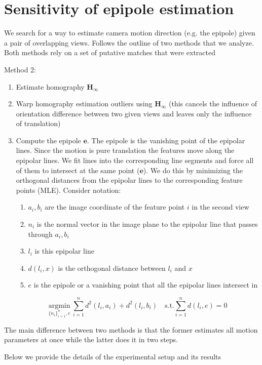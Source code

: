 \documentclass[10pt]{article}         %
\begin{document}
\section{Sensitivity of epipole estimation}
We search for a way to estimate camera motion direction (e.g. the
epipole) given a pair of overlapping views.  Follows the outline of
two methods that we analyze.  Both methods rely on a set of putative matches that were extracted 

\item Method 2:
\begin{enumerate}
\item Estimate homography $\mathbf{H}_{\boldsymbol{\infty}}$
\item Warp homography estimation outliers using
  $\mathbf{H}_{\boldsymbol{\infty}}$ (this cancels the influence of
  orientation difference between two given views and leaves
  only the influence of translation)
\item Compute the epipole $\mathbf{e}$.  The epipole is the vanishing
  point of the epipolar lines. Since the motion is pure translation
  the features move along the epipolar lines. We fit lines into the
  corresponding line segments and force all of them to intersect at
  the same point ($\mathbf{e}$).  We do this by minimizing the
  orthogonal distances from the epipolar lines to the corresponding
  feature points (MLE). Consider notation:
  \begin{enumerate}
  \item $a_i, b_i$ are the image coordinate of the feature point $i$
    in the second view
  \item $n_i$ is the normal vector in the image plane to the epipolar
    line that passes through $a_i,b_i$ 
  \item $l_i$ is this epipolar line
  \item $d(l_i,x)$ is the orthogonal distance between $l_i$ and $x$
  \item $e$ is the epipole or a vanishing point that all the epipolar
    lines intersect in
\end{enumerate}
\[
\underset{\{n_i\}_{i=1}^n,e}{\text{argmin}}\ \sum_{i=1}^nd^2(l_i,a_i) + d^2(l_i,b_i)\quad\text{s.t.} \sum_{i=1}^nd(l_i,e)=0
\]
\end{enumerate}
The main difference between two methods is that the former estimates
all motion parameters at once while the latter does it in two steps.

Below we provide the details of the experimental setup and its results
\end{document}
